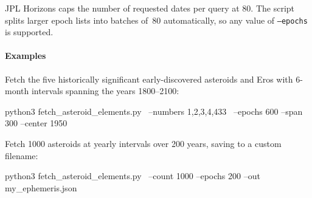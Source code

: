 \noindent JPL Horizons caps the number of requested dates per query at
80.  The script splits larger epoch lists into batches of~80
automatically, so any value of \texttt{--epochs} is supported.
 
\paragraph{Examples}
 
Fetch the five historically significant early-discovered asteroids and
Eros with 6-month intervals spanning the years 1800--2100:
\begin{commands}
python3 fetch_asteroid_elements.py \
    --numbers 1,2,3,4,433 \
    --epochs 600 --span 300 --center 1950
\end{commands}
 
\noindent Fetch 1000 asteroids at yearly intervals over 200 years,
saving to a custom filename:
\begin{commands}
python3 fetch_asteroid_elements.py \
    --count 1000 --epochs 200 --out my_ephemeris.json
\end{commands}



